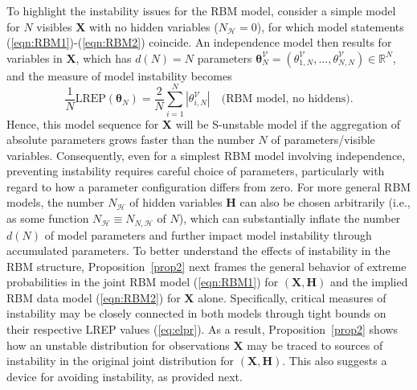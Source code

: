 \documentclass[12pt]{article}
\theoremstyle{definition}
\newcommand{\REP}{\mathrm{LREP}}
\begin{document}
  To highlight the instability issues for the RBM model,
 consider a simple  model for $N$ visibles $\boldsymbol X$ with no hidden variables ($N_{\mathcal{H}}=0$), for which model statements
 (\ref{eqn:RBM1})-(\ref{eqn:RBM2})   coincide.  An independence model then results for variables in $\boldsymbol X$, which has
   $d(N)=N$ parameters $\boldsymbol \theta_N^{\mathcal{V}} = (\theta_{1,N}^{\mathcal{V}},\ldots,\theta_{N,N}^{\mathcal{V}})\in\mathbb{R}^{N}$, and the measure of model instability becomes
 \[
 \frac{1}{N}\REP(\boldsymbol \theta_N) = \frac{2}{N} \sum_{i=1}^N|\theta_{i,N}^{\mathcal{V}}| \quad \mbox{(RBM model, no hiddens)}.
 \]
 Hence, this model sequence for $\boldsymbol X$ will be  S-unstable model if the aggregation of absolute parameters grows faster than the number $N$ of parameters/visible variables.  Consequently, even for a simplest RBM model involving independence,  preventing instability requires careful choice of parameters, particularly with regard to how a parameter configuration differs from zero.     For more general RBM models, the number $N_{\mathcal{H}}$ of hidden variables $\boldsymbol H$ can also be chosen arbitrarily (i.e., as some function $N_{\mathcal{H}}\equiv N_{N,\mathcal{H}}$ of $N$), which can substantially inflate the number $d(N)$ of model parameters  and further impact model instability through accumulated parameters.
  To better understand the effects of instability in the RBM structure,  Proposition~\ref{prop2} next frames the general behavior of
    extreme probabilities in the joint RBM model (\ref{eqn:RBM1}) for  $(\boldsymbol X, \boldsymbol H)$  and the implied RBM data  model (\ref{eqn:RBM2}) for  $\boldsymbol X$ alone.  Specifically,
    critical measures of instability may be closely connected in both models through   tight bounds on their respective LREP  values (\ref{eq:elpr}).  As a result,   Proposition~\ref{prop2} shows how an unstable distribution for observations $\boldsymbol X$  may be traced to  sources of  instability in the original joint distribution for $(\boldsymbol X,\boldsymbol H)$.
   This also suggests a device for avoiding instability, as provided next.
\end{document}
